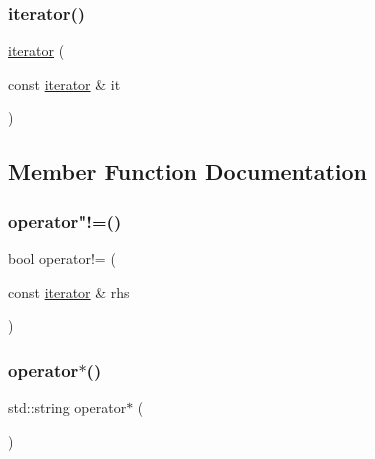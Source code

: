 \subsubsection{\texorpdfstring{iterator()}{iterator()}\hspace{0.1cm}{\footnotesize\ttfamily [3/3]}}
{\footnotesize\ttfamily \mbox{\hyperlink{classDawgLexicon_1_1iterator}{iterator}} (\begin{DoxyParamCaption}\item[{const \mbox{\hyperlink{classDawgLexicon_1_1iterator}{iterator}} \&}]{it }\end{DoxyParamCaption})\hspace{0.3cm}{\ttfamily [inline]}}



\subsection{Member Function Documentation}
\mbox{\label{classDawgLexicon_1_1iterator_ae1983f2cb0df1f0cbe77ac29590e2e2b}} 
\subsubsection{\texorpdfstring{operator"!=()}{operator!=()}}
{\footnotesize\ttfamily bool operator!= (\begin{DoxyParamCaption}\item[{const \mbox{\hyperlink{classDawgLexicon_1_1iterator}{iterator}} \&}]{rhs }\end{DoxyParamCaption})\hspace{0.3cm}{\ttfamily [inline]}}

\mbox{\label{classDawgLexicon_1_1iterator_aa3864db3883c7a53277427a06ed3e017}} 
\subsubsection{\texorpdfstring{operator$\ast$()}{operator*()}}
{\footnotesize\ttfamily std\+::string operator$\ast$ (\begin{DoxyParamCaption}{ }\end{DoxyParamCaption})\hspace{0.3cm}{\ttfamily [inline]}}


